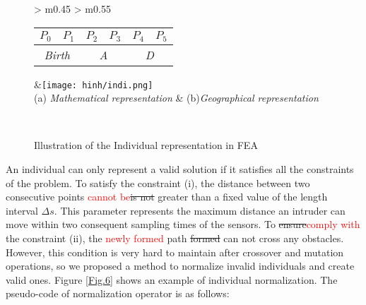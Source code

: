 \documentclass[final]{elsarticle}
\begin{document}
\begin{figure*}[h]
	\renewcommand{\arraystretch}{1.5}
	\centering
	\begin{tabular}{ >{\centering\arraybackslash} m{0.45\linewidth} >{\centering\arraybackslash} m{0.55\linewidth} }
		\begin{tabular}{|c|c|c|c|c|c|}
			\hline 
			$P_0$ & $P_1$ & $P_2$ & $P_3$ & $P_4$ & $P_5$  \\
			\hline \hline
			\multicolumn{2}{|c|}{\textit{Birth}} & \multicolumn{2}{c|}{\textit{A}}  & \multicolumn{2}{c|}{\textit{D}}  \\
			\hline
		\end{tabular} &\texttt{[image: hinh/indi.png]} \\
		(a) \textit{Mathematical representation} & (b)\textit{Geographical representation} \\
	\end{tabular}
	\\
	\caption{Illustration of the Individual representation in FEA
	}
	\label{Fig.4}       %
\end{figure*}

An individual can only represent a valid solution if it satisfies all the constraints of the problem. To satisfy the constraint (i), the distance between two consecutive points \textcolor{red}{cannot be}\sout{is not} greater than a fixed value of the length interval $\Delta s$. This parameter represents the maximum distance an intruder can move within two consequent sampling times of the sensors. To \sout{ensure}\textcolor{red}{comply with} the constraint (ii), the \textcolor{red}{newly formed} path \sout{formed} can not cross any obstacles. However, this condition is very hard to maintain after crossover and mutation operations, so we proposed a method to normalize invalid individuals and create valid ones. Figure \ref{Fig.6} shows an example of individual normalization. The pseudo-code of normalization operator is as follows:
\end{document}
